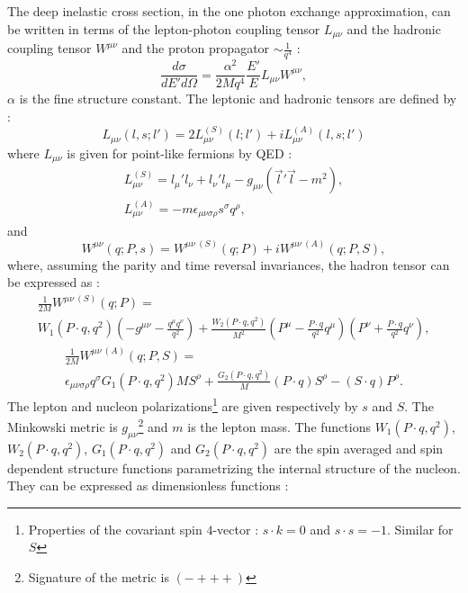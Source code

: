 The deep inelastic cross section, in the one photon exchange approximation, can be written in terms of the lepton-photon coupling tensor $L_{\mu\nu}$ and the hadronic coupling tensor $W^{\mu\nu}$ and the proton propagator $\sim \frac{1}{q^4}$ \cite{AEL} :
%
\begin{equation}
  \frac{d\sigma}{dE'd\Omega} = \frac{\alpha^2}{2Mq^4}\frac{E'}{E}L_{\mu\nu}W^{\mu\nu},
  \label{eq:coupling}
\end{equation}
%
$\alpha$ is the fine structure constant. The leptonic and hadronic tensors are defined by \cite{SchoolFermi} :
%
\begin{equation}
  L_{\mu\nu}(l,s;l') = 2{L^{(S)}_{\mu\nu}(l;l')+iL^{(A)}_{\mu\nu}(l,s;l')}
\end{equation}
%
where $L_{\mu\nu}$ is given for point-like fermions by QED :
%
\begin{equation}
  \begin{split}
    L^{(S)}_{\mu\nu} = l_{\mu}'l_{\nu} + l_{\nu}'l_{\mu} - g_{\mu\nu}(\vec{l}'\vec{l}-m^2), \\
    L^{(A)}_{\mu\nu} = -m\epsilon_{\mu\nu\sigma\rho}s^{\sigma}q^{\rho},
  \end{split}
\end{equation}
%
and
%
\begin{equation}
  W^{\mu\nu}(q;P,s) = W^{\mu\nu\ (S)}(q;P) + iW^{\mu\nu\ (A)}(q;P,S),
\end{equation}
%
where, assuming the parity and time reversal invariances, the hadron tensor can be expressed as :
%
\begin{equation}
  \begin{split}
    \frac{1}{2M}W^{\mu\nu\ (S)}(q;P) = \\
    W_1(P\cdot q,q^2)\left(-g^{\mu\nu}-\frac{q^{\mu}q^{\nu}}{q^2}\right)+\frac{W_2(P\cdot q,q^2)}{M^2}\left(P^{\mu}-\frac{P\cdot q}{q^2}q^{\mu}\right)\left(P^{\nu}+\frac{P\cdot q}{q^2}q^{\nu}\right),
  \end{split}
\end{equation}
%
\begin{equation}
  \begin{split}
    \frac{1}{2M}W^{\mu\nu\ (A)}(q;P,S) = \\
    \epsilon_{\mu\nu\sigma\rho}q^{\sigma}{G_1(P\cdot q,q^2)MS^{\rho}+\frac{G_2(P\cdot q,q^2)}{M}(P\cdot q)S^{\rho}-(S\cdot q)P^{\rho}}.
  \end{split}
\end{equation}
%
The lepton and nucleon polarizations\footnote{Properties of the covariant spin $4$-vector : $s \cdot k = 0$ and $s \cdot s = -1$. Similar for $S$} are given respectively by $s$ and $S$. The Minkowski metric is $g_{\mu\nu}$\footnote{Signature of the metric is $(-+++)$} and $m$ is the lepton mass. The functions $W_1(P \cdot q,q^2)$, $W_2(P\cdot q,q^2)$, $G_1(P\cdot q,q^2)$ and $G_2(P\cdot q,q^2)$ are the spin averaged and spin dependent structure functions parametrizing the internal structure of the nucleon. They can be expressed as dimensionless functions :
